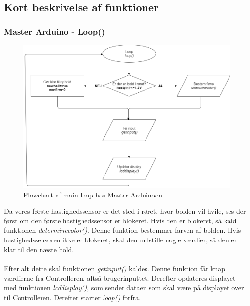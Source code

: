 \subsection{Kort beskrivelse af funktioner}\label{sec:primaerefunc}
\subsubsection{Master Arduino - Loop()}
\begin{figure}[H]
	\centering
    \includegraphics[width=\textwidth]{figures/arduino/M-loop.png}
	\caption{Flowchart af main loop hos Master Arduinoen}
	\label{flow:loop}
\end{figure}
Da vores første hastighedssensor er det sted i røret, hvor bolden vil hvile, ses der først om den første hastighedssensor er blokeret. Hvis den er blokeret, så kald funktionen \textit{determinecolor()}. Denne funktion bestemmer farven af bolden. Hvis hastighedssensoren ikke er blokeret, skal den nulstille nogle værdier, så den er klar til den næste bold.\\
\\
Efter alt dette skal funktionen \textit{getinput()} kaldes. Denne funktion får knap værdierne fra Controlleren, altså brugerinputtet. Derefter opdateres displayet med funktionen \textit{lcddisplay()}, som sender dataen som skal være på displayet over til Controlleren. Derefter starter \textit{loop()} forfra.

